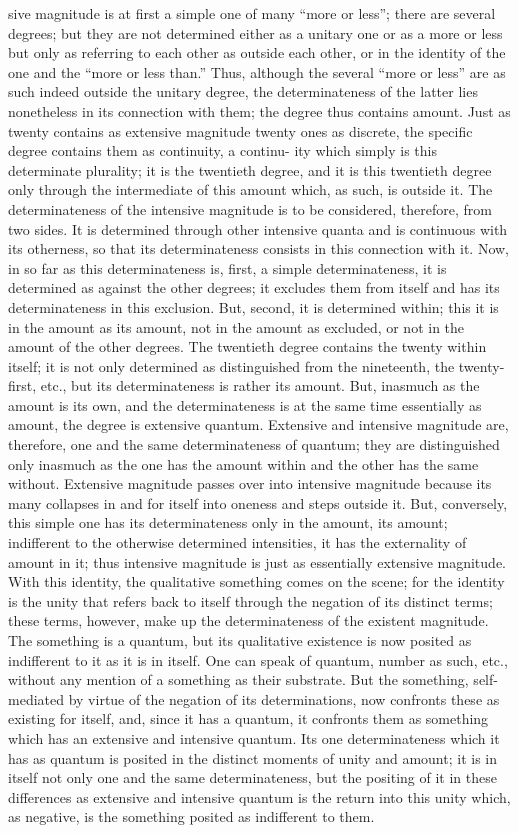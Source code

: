 sive magnitude is at first a simple one of many “more or less”; there are several
degrees; but they are not determined either as a unitary one or as a more or
less but only as referring to each other as outside each other, or in the identity
of the one and the “more or less than.” Thus, although the several “more
or less” are as such indeed outside the unitary degree, the determinateness
of the latter lies nonetheless in its connection with them; the degree thus
contains amount. Just as twenty contains as extensive magnitude twenty
ones as discrete, the specific degree contains them as continuity, a continu-
ity which simply is this determinate plurality; it is the twentieth degree, and
it is this twentieth degree only through the intermediate of this amount
which, as such, is outside it.
The determinateness of the intensive magnitude is to be considered,
therefore, from two sides. It is determined through other intensive quanta
and is continuous with its otherness, so that its determinateness consists
in this connection with it. Now, in so far as this determinateness is, first,
a simple determinateness, it is determined as against the other degrees; it
excludes them from itself and has its determinateness in this exclusion.
But, second, it is determined within; this it is in the amount as its amount,
not in the amount as excluded, or not in the amount of the other degrees.
The twentieth degree contains the twenty within itself; it is not only
determined as distinguished from the nineteenth, the twenty-first, etc.,
but its determinateness is rather its amount. But, inasmuch as the amount
is its own, and the determinateness is at the same time essentially as amount,
the degree is extensive quantum.
Extensive and intensive magnitude are, therefore, one and the same
determinateness of quantum; they are distinguished only inasmuch as the
one has the amount within and the other has the same without. Extensive
magnitude passes over into intensive magnitude because its many collapses
in and for itself into oneness and steps outside it. But, conversely, this simple
one has its determinateness only in the amount, its amount; indifferent to
the otherwise determined intensities, it has the externality of amount in it;
thus intensive magnitude is just as essentially extensive magnitude.
With this identity, the qualitative something comes on the scene; for
the identity is the unity that refers back to itself through the negation of
its distinct terms; these terms, however, make up the determinateness of
the existent magnitude. The something is a quantum, but its qualitative
existence is now posited as indifferent to it as it is in itself. One can speak
of quantum, number as such, etc., without any mention of a something as
their substrate. But the something, self-mediated by virtue of the negation
of its determinations, now confronts these as existing for itself, and, since
it has a quantum, it confronts them as something which has an extensive
and intensive quantum. Its one determinateness which it has as quantum
is posited in the distinct moments of unity and amount; it is in itself not
only one and the same determinateness, but the positing of it in these
differences as extensive and intensive quantum is the return into this unity
which, as negative, is the something posited as indifferent to them.

